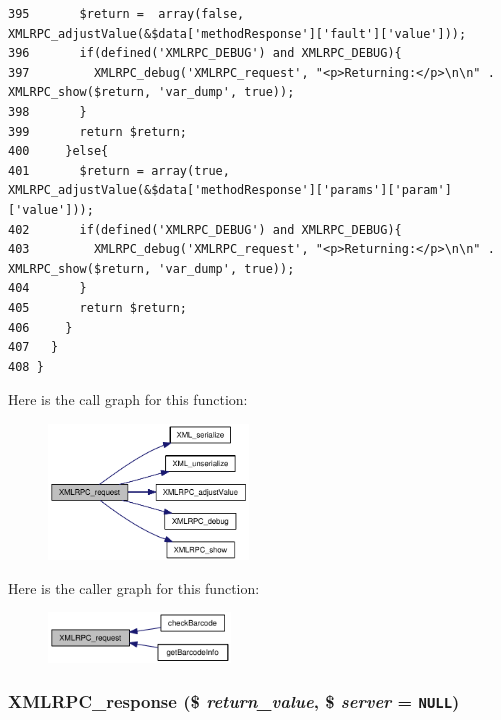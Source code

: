 \begin{Code}
\begin{verbatim}
395       $return =  array(false, XMLRPC_adjustValue(&$data['methodResponse']['fault']['value']));
396       if(defined('XMLRPC_DEBUG') and XMLRPC_DEBUG){
397         XMLRPC_debug('XMLRPC_request', "<p>Returning:</p>\n\n" . XMLRPC_show($return, 'var_dump', true));
398       }
399       return $return;
400     }else{
401       $return = array(true, XMLRPC_adjustValue(&$data['methodResponse']['params']['param']['value']));
402       if(defined('XMLRPC_DEBUG') and XMLRPC_DEBUG){
403         XMLRPC_debug('XMLRPC_request', "<p>Returning:</p>\n\n" . XMLRPC_show($return, 'var_dump', true));
404       }
405       return $return;
406     }
407   }
408 }
\end{verbatim}
\end{Code}




Here is the call graph for this function:\nopagebreak
\begin{figure}[H]
\begin{center}
\leavevmode
\includegraphics[width=151pt]{xmlrpc_8inc_3a98b6984b8ca01752d1aa9a267526a3_cgraph}
\end{center}
\end{figure}


Here is the caller graph for this function:\nopagebreak
\begin{figure}[H]
\begin{center}
\leavevmode
\includegraphics[width=137pt]{xmlrpc_8inc_3a98b6984b8ca01752d1aa9a267526a3_icgraph}
\end{center}
\end{figure}
\hypertarget{xmlrpc_8inc_c736d378caaccdd0726ea1080d1f526f}{
\subsubsection{\setlength{\rightskip}{0pt plus 5cm}XMLRPC\_\-response (\$ {\em return\_\-value}, \$ {\em server} = {\tt NULL})}}
\label{xmlrpc_8inc_c736d378caaccdd0726ea1080d1f526f}




